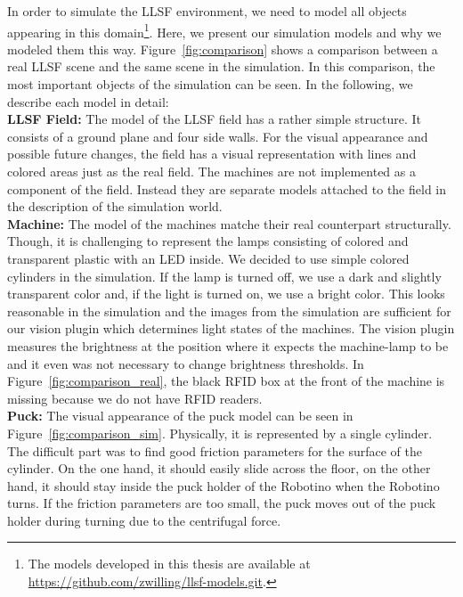 In order to simulate the LLSF environment, we need to model all objects appearing in this domain\footnote{The models developed in this thesis are available at \url{https://github.com/zwilling/llsf-models.git}.}. Here, we present our simulation models and why we modeled them this way. Figure~\ref{fig:comparison} shows a comparison between a real LLSF scene and the same scene in the simulation. In this comparison, the most important objects of the simulation can be seen. In the following, we describe each model in detail:\\
\textbf{LLSF Field:} The model of the LLSF field has a rather simple structure. It consists of a ground plane and four side walls. For the visual appearance and possible future changes, the field has a visual representation with lines and colored areas just as the real field. The machines are not implemented as a component of the field. Instead they are separate models attached to the field in the description of the simulation world.\\
\textbf{Machine:} The model of the machines matche their real counterpart structurally. Though, it is challenging to represent the lamps consisting of colored and transparent plastic with an LED inside. We decided to use simple colored cylinders in the simulation. If the lamp is turned off, we use a dark and slightly transparent color and, if the light is turned on, we use a bright color. This looks reasonable in the simulation and the images from the simulation are sufficient for our vision plugin which determines light states of the machines. The vision plugin measures the brightness at the position where it expects the machine-lamp to be and it even was not necessary to change brightness thresholds. In Figure~\ref{fig:comparison_real}, the black RFID box at the front of the machine is missing because we do not have RFID readers.\\
\textbf{Puck:} The visual appearance of the puck model can be seen in Figure~\ref{fig:comparison_sim}. Physically, it is represented by a single cylinder. The difficult part was to find good friction parameters for the surface of the cylinder. On the one hand, it should easily slide across the floor, on the other hand, it should stay inside the puck holder of the Robotino when the Robotino turns. If the friction parameters are too small, the puck moves out of the puck holder during turning due to the centrifugal force.\\
